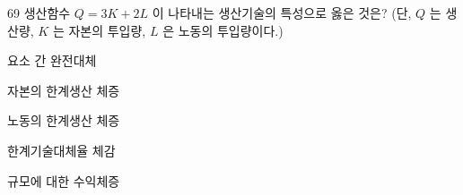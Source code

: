\begin{question}{69}
생산함수 $Q= { 3K+2L }$ 이 나타내는 생산기술의 특성으로 옳은 것은? (단, $Q$ 는 생산량, $K$ 는 자본의 투입량, $L$ 은 노동의 투입량이다.)
\begin{choices}
  \item 요소 간 완전대체
  \item 자본의 한계생산 체증
  \item 노동의 한계생산 체증
  \item 한계기술대체율 체감
  \item 규모에 대한 수익체증
\end{choices}
\end{question}
